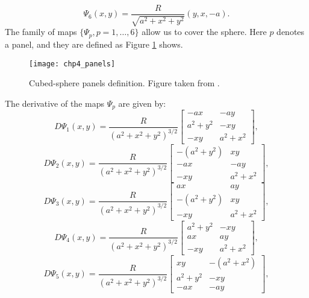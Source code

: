 \begin{equation}
	\label{chp3-eqdistant-psi6}
	\Psi_{6}(x,y) = \frac{R}{\sqrt{a^2 + x^2 + y^2}}(y, x, -a).
\end{equation}
The family of maps $\{\Psi_{p}, p = 1, \ldots, 6\}$ allow us to cover the sphere.
Here $p$ denotes a panel, and they are defined as Figure \ref{chp4-panels} shows.
\begin{figure}[!htb]
	\centering
		\texttt{[image: chp4\_panels]}
	\caption{Cubed-sphere panels definition. Figure taken from \citet{ronchi:1996}.\label{chp4-panels}}
\end{figure}
The derivative of the maps $\Psi_p$ are given by:
\begin{equation}
	\label{chp3-eqdistant-dpsi1}
	D\Psi_{1}(x,y) = \frac{R}{{(a^2 + x^2 + y^2)}^{3/2}}
	\begin{bmatrix}
		-ax & -ay \\
	 	 a^2+y^2  & -xy \\
		 -xy  & a^2+x^2
	\end{bmatrix},
\end{equation}
\begin{equation}
	\label{chp3-eqdistant-dpsi2}
	D\Psi_{2}(x,y) = \frac{R}{{(a^2 + x^2 + y^2)}^{3/2}}
	\begin{bmatrix}
		-(a^2+y^2) & xy \\
		 -ax &  -ay \\
		 -xy &  a^2+x^2
	\end{bmatrix},
\end{equation}
\begin{equation}
	\label{chp3-eqdistant-dpsi3}
	D\Psi_{3}(x,y) = \frac{R}{{(a^2 + x^2 + y^2)}^{3/2}}
	\begin{bmatrix}
		 ax &  ay \\
		-(a^2+y^2) & xy \\
		 -xy &  a^2+x^2
	\end{bmatrix},
\end{equation}
\begin{equation}
	\label{chp3-eqdistant-dpsi4}
	D\Psi_{4}(x,y) = \frac{R}{{(a^2 + x^2 + y^2)}^{3/2}}	
	\begin{bmatrix}
		 a^2+y^2 &  -xy \\
		 ax & ay \\
		 -xy &  a^2+x^2
	\end{bmatrix},
\end{equation}
\begin{equation}
	\label{chp3-eqdistant-dpsi5}
	D\Psi_{5}(x,y) = \frac{R}{{(a^2 + x^2 + y^2)}^{3/2}}	
	\begin{bmatrix}
		 xy  & -(a^2+x^2) \\
	 	 a^2+y^2  &  -xy \\
		-ax & -ay
	\end{bmatrix},
\end{equation}
